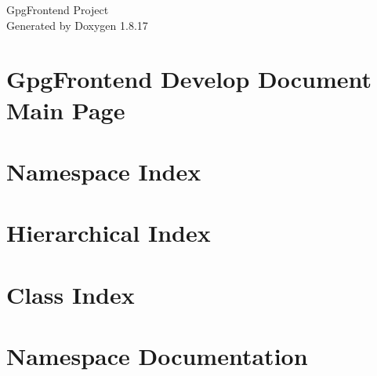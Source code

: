 \let\mypdfximage\pdfximage\def\pdfximage{\immediate\mypdfximage}\documentclass[twoside]{book}
\newcommand{\+}{\discretionary{\mbox{\scriptsize$\hookleftarrow$}}{}{}}
\newcommand{\clearemptydoublepage}{%
  \newpage{\pagestyle{empty}\cleardoublepage}%
}
\begin{document}
\hypersetup{pageanchor=false,
             bookmarksnumbered=true,
             pdfencoding=unicode
            }
\begin{titlepage}
\vspace*{7cm}
\begin{center}%
{\Large Gpg\+Frontend Project }\\
\vspace*{1cm}
{\large Generated by Doxygen 1.8.17}\\
\end{center}
\end{titlepage}
\clearemptydoublepage
{}
\tableofcontents
\clearemptydoublepage
{}
\hypersetup{pageanchor=true}

\chapter{Gpg\+Frontend Develop Document Main Page}
\label{index}\hypertarget{index}{}
\chapter{Namespace Index}

\chapter{Hierarchical Index}

\chapter{Class Index}

\chapter{Namespace Documentation}




\end{document}

